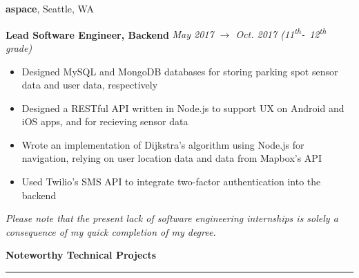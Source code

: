 \documentclass[10pt]{article}
\begin{document}
\begin{flushleft}
		\vspace{-1.50mm}
		\textbf{aspace}, Seattle, WA\\
		\begin{leftli}
			{\small \textbf{Lead Software Engineer, Backend}} \hfill \textit{\small May 2017 $\rightarrow$ Oct. 2017 (11\textsuperscript{th}\texttt{-} 12\textsuperscript{th} grade)}

			\begin{itemize}
				\item Designed MySQL and MongoDB databases for storing parking spot sensor data and user data, respectively
				\vspace{-2mm}
				\item Designed a RESTful API written in Node.js to support UX on Android and iOS apps, and for recieving sensor data
				\vspace{-2mm}
				\item Wrote an implementation of Dijkstra's algorithm using Node.js for navigation, relying on user location data and data from Mapbox's API
				\vspace{-2mm}
				\item Used Twilio's SMS API to integrate two-factor authentication into the backend
			\end{itemize}
		\end{leftli}
		\vspace{-1mm}
		{\footnotesize \textit{Please note that the present lack of software engineering internships is solely a consequence of my quick completion of my degree.}}

		\vspace{1.25mm}
		{\large \raggedright \textbf{Noteworthy Technical Projects}}
		\vspace{1.25mm}
	
		\hrule
	

\end{flushleft}
\end{document}
